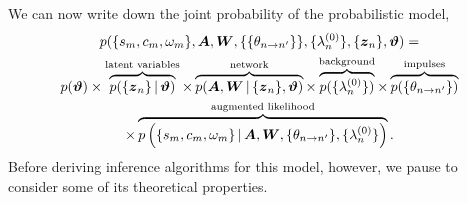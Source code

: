We can now write down the joint probability of the probabilistic model,
\begin{multline}
\label{eq:hawkes_complete_model}
p(\{s_m, c_m, \omega_m\}, \boldsymbol{A}, \boldsymbol{W}, \{\{\theta_{n \to n'}\}\}, \{\lambda^{(0)}_{n}\}, \{\boldsymbol{z}_n\}, \boldsymbol{\vartheta}) 
=  \\
p(\boldsymbol{\vartheta})
\times \overbrace{p(\{\boldsymbol{z}_n\} \,|\, \boldsymbol{\vartheta})}^\text{latent variables}
\times \overbrace{p(\boldsymbol{A}, \boldsymbol{W} \,|\, \{\boldsymbol{z}_{n}\}, \boldsymbol{\vartheta})}^\text{network} 
\times \overbrace{p(\{\lambda^{(0)}_{n}\})}^\text{background}
\times \overbrace{p(\{\theta_{n\to n'}\})}^\text{impulses} \\
\times \overbrace{  p \left(\{s_m, c_m, \omega_m\} \,|\, \boldsymbol{A}, \boldsymbol{W}, \{\theta_{n \to n'}\}, \{\lambda^{(0)}_{n}\} \right) }^\text{augmented likelihood}.
\end{multline}
Before deriving inference algorithms for this model, however, we pause 
to consider some of its theoretical properties.





